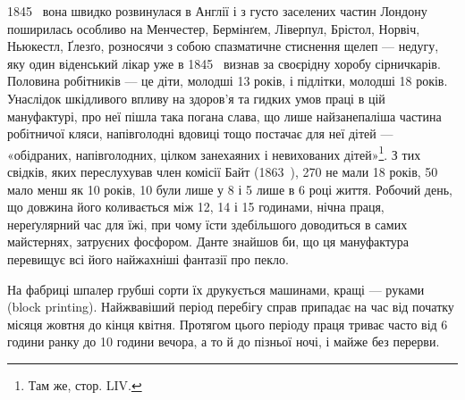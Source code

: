 \parcont{}  %
1845~ вона швидко розвинулася в Англії і з густо заселених
частин Лондону поширилась особливо на Менчестер, Бермінґем,
Ліверпул, Брістол, Норвіч, Ньюкестл, Ґлезґо, розносячи з
собою спазматичне стиснення щелеп — недугу, яку один віденський
лікар уже в 1845~ визнав за своєрідну хоробу сірничкарів.
Половина робітників — це діти, молодші 13 років, і
підлітки, молодші 18 років. Унаслідок шкідливого впливу на
здоров’я та гидких умов праці в цій мануфактурі, про неї пішла
така погана слава, що лише найзанепаліша частина робітничої
кляси, напівголодні вдовиці тощо постачає для неї дітей — «обідраних,
напівголодних, цілком занехаяних і невихованих дітей»\footnote{
Там же, стор. LIV.
}.
З тих свідків, яких переслухував член комісії Байт (1863~),
270 не мали 18 років, 50 мало менш як 10 років, 10 були лише
у 8 і 5 лише в 6 році життя. Робочий день, що довжина його коливається
між 12, 14 і 15 годинами, нічна праця, нереґулярний
час для їжі, при чому їсти здебільшого доводиться в самих майстернях,
затруєних фосфором. Данте знайшов би, що ця мануфактура
перевищує всі його найжахніші фантазії про пекло.

На фабриці шпалер грубші сорти їх друкується машинами,
кращі — руками (block printing). Найжвавіший період перебігу
справ припадає на час від початку місяця жовтня до кінця
квітня. Протягом цього періоду праця триває часто від 6 години
ранку до 10 години вечора, а то й до пізньої ночі, і майже без
перерви.


